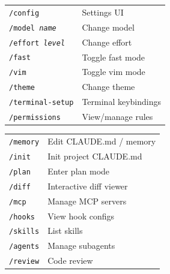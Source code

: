 \documentclass[10pt]{extarticle}
\begin{document}
\begin{multicols}{2}
\begin{tabularx}{\linewidth}{@{}l@{\enspace}Y@{}}
\texttt{/config}                     & Settings UI \\
\texttt{/model \textit{name}}       & Change model \\
\texttt{/effort \textit{level}}     & Change effort \\
\texttt{/fast}                       & Toggle fast mode \\
\texttt{/vim}                        & Toggle vim mode \\
\texttt{/theme}                      & Change theme \\
\texttt{/terminal-setup}            & Terminal keybindings \\
\texttt{/permissions}                & View/manage rules \\
\end{tabularx}

\begin{tabularx}{\linewidth}{@{}l@{\enspace}Y@{}}
\texttt{/memory}                     & Edit CLAUDE.md / memory \\
\texttt{/init}                       & Init project CLAUDE.md \\
\texttt{/plan}                       & Enter plan mode \\
\texttt{/diff}                       & Interactive diff viewer \\
\texttt{/mcp}                        & Manage MCP servers \\
\texttt{/hooks}                      & View hook configs \\
\texttt{/skills}                     & List skills \\
\texttt{/agents}                     & Manage subagents \\
\texttt{/review}                     & Code review \\
\end{tabularx}


\end{multicols}
\end{document}
